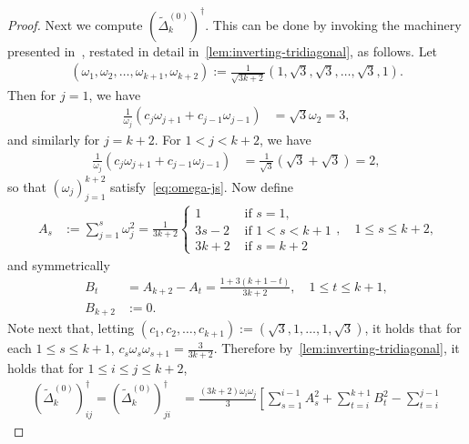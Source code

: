 \documentclass[11pt,a4paper]{amsart}
\begin{document}
\begin{proof}
    Next we compute $(\widetilde{\Delta}_k^{(0)})^\dagger$. This can be done by invoking the machinery presented in~\cite{bendito2010generalized}, restated in detail in~\cref{lem:inverting-tridiagonal}, as follows. Let
        \begin{align*}
            (\omega_1, \omega_2, \dotsc, \omega_{k+1}, \omega_{k+2}) := \frac{1}{\sqrt{3k+2}} (1, \sqrt{3}, \sqrt{3}, \dotsc, \sqrt{3}, 1).
        \end{align*}
    Then for $j=1$, we have
        \begin{align*}
            \frac{1}{\omega_j}\left(c_j\omega_{j+1} + c_{j-1}\omega_{j-1}\right) &= \sqrt{3}\omega_2 = 3,
        \end{align*}
    and similarly for $j=k+2$. For $1 < j < k+2$, we have
        \begin{align*}
            \frac{1}{\omega_j}\left(c_j\omega_{j+1} + c_{j-1}\omega_{j-1}\right) &= \frac{1}{\sqrt{3}} (\sqrt{3} + \sqrt{3}) = 2,
        \end{align*}
    so that $(\omega_j)_{j=1}^{k+2}$ satisfy~\cref{eq:omega-js}. Now define
        \begin{align*}
            A_s &:= \sum_{j=1}^s \omega_j^2 = \frac{1}{3k+2}\begin{cases}
                1 &\text{ if }s=1,\\
                3s-2 &\text{ if }1 < s < k+1\\
                3k+2 &\text{ if }s = k+2 
            \end{cases},\quad 1\leq s\leq k+2,
        \end{align*}
    and symmetrically 
        \begin{align*}
            B_t &= A_{k+2} - A_{t} = \frac{1 + 3(k+1-t)}{3k+2},\quad 1\leq t\leq k+1,\\
            B_{k+2} &:= 0.
        \end{align*}
    Note next that, letting $(c_1, c_2,\dotsc, c_{k+1}) := (\sqrt{3}, 1, \dotsc, 1, \sqrt{3})$, it holds that for each $1\leq s \leq k+1$, $c_s\omega_s\omega_{s+1} = \frac{3}{3k+2}$. Therefore by~\cref{lem:inverting-tridiagonal}, it holds that for $1\leq i \leq j\leq k+2$,
        \begin{align*}
            (\widetilde{\Delta}_k^{(0)})^\dagger_{ij} = (\widetilde{\Delta}_k^{(0)})^\dagger_{ji} &= \frac{(3k+2)\omega_i \omega_j}{3} \left[
                \sum_{s=1}^{i-1} A_s^2
                +
                \sum_{t=i}^{k+1}
                B_t^2
                -
                \sum_{t=i}^{j-1}

\end{align*}
\end{proof}
\end{document}
